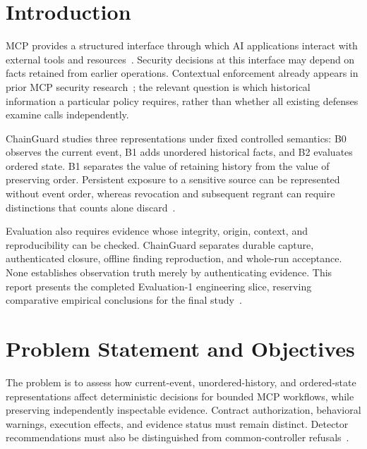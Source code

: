 \documentclass[conference]{IEEEtran}
\begin{document}
\section{Introduction}
MCP provides a structured interface through which AI applications interact with external tools and resources~\cite{mcp2026}. Security decisions at this interface may depend on facts retained from earlier operations. Contextual enforcement already appears in prior MCP security research~\cite{wang2026}; the relevant question is which historical information a particular policy requires, rather than whether all existing defenses examine calls independently.

ChainGuard studies three representations under fixed controlled semantics: B0 observes the current event, B1 adds unordered historical facts, and B2 evaluates ordered state. B1 separates the value of retaining history from the value of preserving order. Persistent exposure to a sensitive source can be represented without event order, whereas revocation and subsequent regrant can require distinctions that counts alone discard~\cite{cglock}.

Evaluation also requires evidence whose integrity, origin, context, and reproducibility can be checked. ChainGuard separates durable capture, authenticated closure, offline finding reproduction, and whole-run acceptance. None establishes observation truth merely by authenticating evidence. This report presents the completed Evaluation-1 engineering slice, reserving comparative empirical conclusions for the final study~\cite{cgresults,cgprotocol}.

\section{Problem Statement and Objectives}
The problem is to assess how current-event, unordered-history, and ordered-state representations affect deterministic decisions for bounded MCP workflows, while preserving independently inspectable evidence. Contract authorization, behavioral warnings, execution effects, and evidence status must remain distinct. Detector recommendations must also be distinguished from common-controller refusals~\cite{cglock,cgprotocol}.
\end{document}
